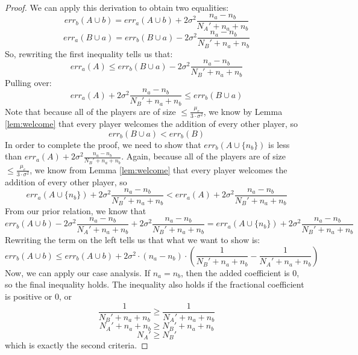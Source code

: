\documentclass{article}
\newcommand{\p}[1]{\left( #1 \right)}
\newcommand{\cd}[0]{\cdot}
\newcommand{\mue}[0]{\ensuremath{\mu_e}}
\newcommand{\var}[0]{\ensuremath{\sigma^2}}
\newcommand{\ndraw}[0]{\ensuremath{n}}
\newcommand{\total}[0]{\ensuremath{N}}
\begin{document}
\begin{proof}
We can apply this derivation to obtain two equalities: 
$$err_b(A \cup b) = err_a(A \cup b) + 2 \var \frac{\ndraw_a - \ndraw_b}{\total_A' + \ndraw_a + \ndraw_b}$$
$$err_a(B \cup a) = err_b(B \cup a) - 2 \var \frac{\ndraw_a - \ndraw_b}{\total_B' + \ndraw_a + \ndraw_b}$$
So, rewriting the first inequality tells us that: 
$$err_a(A) \leq  err_b(B \cup a) - 2 \var \frac{\ndraw_a - \ndraw_b}{\total_B' + \ndraw_a + \ndraw_b}$$
Pulling over: 
$$err_a(A) + 2 \var \frac{\ndraw_a - \ndraw_b}{\total_B' + \ndraw_a + \ndraw_b}\leq err_b(B \cup a)$$
Note that because all of the players are of size $\leq \frac{\mue}{3\cd \var}$, we know by Lemma \ref{lem:welcome} that every player welcomes the addition of every other player, so 
$$err_b(B \cup a) < err_b(B)$$
In order to complete the proof, we need to show that $err_b(A \cup \{\ndraw_b\})$ is less than $err_a(A) + 2 \var \frac{\ndraw_a - \ndraw_b}{\total_B' + \ndraw_a + \ndraw_b}$. Again, because all of the players are of size $\leq \frac{\mue}{3\cd \var}$, we know from Lemma \ref{lem:welcome} that every player welcomes the addition of every other player, so
$$err_a(A \cup \{\ndraw_b\}) + 2 \var \frac{\ndraw_a - \ndraw_b}{\total_B' + \ndraw_a + \ndraw_b}<err_a(A) + 2 \var \frac{\ndraw_a - \ndraw_b}{\total_B' + \ndraw_a + \ndraw_b}$$
From our prior relation, we know that
$$err_b(A \cup b) -2 \var \frac{\ndraw_a - \ndraw_b}{\total_A' + \ndraw_a + \ndraw_b} +2 \var \frac{\ndraw_a - \ndraw_b}{\total_B' + \ndraw_a + \ndraw_b} =  err_a(A \cup \{\ndraw_b\}) + 2 \var \frac{\ndraw_a - \ndraw_b}{\total_B' + \ndraw_a + \ndraw_b}$$
Rewriting the term on the left tells us that what we want to show is:
$$err_b(A \cup b) \leq err_b(A \cup b) +2 \var \cd (\ndraw_a - \ndraw_b) \cd \p{\frac{1}{\total_B' + \ndraw_a + \ndraw_b} - \frac{1}{\total_A' + \ndraw_a + \ndraw_b}} $$
Now, we can apply our case analysis. If $\ndraw_a = \ndraw_b$, then the added coefficient is 0, so the final inequality holds. The inequality also holds if the fractional coefficient is positive or 0, or 
$$\frac{1}{\total_B' + \ndraw_a + \ndraw_b} \geq \frac{1}{\total_A' + \ndraw_a + \ndraw_b}$$
$$ \total_A' + \ndraw_a + \ndraw_b \geq \total_B' + \ndraw_a + \ndraw_b$$
$$ \total_A' \geq \total_B'$$
which is exactly the second criteria. 
\end{proof}
\end{document}
